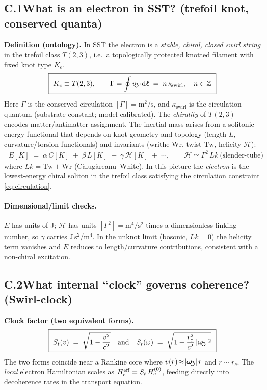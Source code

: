 \documentclass[aps,prb,preprint,amsmath,amssymb]{revtex4-2} %
\newcommand{\vswirl}{v_{\!\mkern-2mu\scriptstyle\boldsymbol{\circlearrowleft}}}
\newcommand{\rc}{r_c}
\newcommand{\omegas}{\boldsymbol{\omega}_{\!\mkern-2mu\scriptstyle\boldsymbol{\circlearrowleft}}} %
\begin{document}
    \subsection*{C.1\quad What is an electron in SST? (trefoil knot, conserved quanta)}
        \textbf{Definition (ontology).} In SST the electron is a \emph{stable, chiral, closed swirl string} in the trefoil class \(T(2,3)\), i.e.\ a topologically protected knotted filament with fixed knot type \(K_e\).
        \begin{align}
            \boxed{\ K_e \equiv T(2,3),\qquad \Gamma=\oint \vswirl\!\cdot\!\dd\boldsymbol{\ell}\;=\;n\,\kappa_{\!\text{swirl}},\quad n\in\mathbb{Z}\ }
            \label{eq:circulation}
        \end{align}
        Here \(\Gamma\) is the conserved circulation \([\Gamma]=\mathrm{m^2/s}\), and \(\kappa_{\!\text{swirl}}\) is the circulation quantum (substrate constant; model-calibrated). The \emph{chirality} of \(T(2,3)\) encodes matter/antimatter assignment. The inertial mass arises from a solitonic energy functional that depends on knot geometry and topology (length \(L\), curvature/torsion functionals) and invariants (writhe \(\mathrm{Wr}\), twist \(\mathrm{Tw}\), helicity \(\mathcal H\)):
        \begin{align}
            \boxed{\ E[K]\;=\;\alpha\,C[K]\;+\;\beta\,L[K]\;+\;\gamma\,\mathcal H[K]\;+\;\cdots,\qquad
            \mathcal H \simeq \Gamma^{2}\,Lk \ \text{(slender-tube)}\ }
            \label{eq:energy-fn}
        \end{align}
        where \(Lk=\mathrm{Tw}+\mathrm{Wr}\) (Călugăreanu–White). In this picture the \emph{electron} is the lowest-energy chiral soliton in the trefoil class satisfying the circulation constraint \eqref{eq:circulation}.

        \paragraph*{Dimensional/limit checks.}
            \(E\) has units of J; \(\mathcal H\) has units \([\Gamma^2]=\mathrm{m^4/s^2}\) times a dimensionless linking number, so \(\gamma\) carries J\,s\(^2\)/m\(^4\). In the unknot limit (bosonic, \(Lk=0\)) the helicity term vanishes and \(E\) reduces to length/curvature contributions, consistent with a non-chiral excitation.

    \subsection*{C.2\quad What internal “clock” governs coherence? (Swirl-clock)}
    \textbf{Clock factor (two equivalent forms).}
    \begin{align}
        \boxed{\ S_t(v)\;=\;\sqrt{1-\frac{v^2}{c^2}}\quad\text{and}\quad
        S_t(\omega)\;=\;\sqrt{1-\frac{\rc^{2}}{c^{2}}\,|\omegas|^{2}}\ }
        \label{eq:clock}
    \end{align}
    The two forms coincide near a Rankine core where \(v(r)\!\approx\!|\omegas|\,r\) and \(r\!\sim\!\rc\). The \emph{local} electron Hamiltonian scales as \(H_e^{\rm eff}=S_t\,H_e^{(0)}\), feeding directly into decoherence rates in the transport equation.
\end{document}
